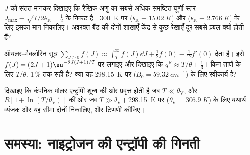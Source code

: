 \begin{exercise}[$\star\star\star$]\label{exo:b3:partition-functions:10}
$J$ को संतत मानकर दिखाइए कि रैखिक अणु का सबसे अधिक समष्टित घूर्णी स्तर
$J_{\max} = \sqrt{T/2\theta_{\mathrm R}} - \frac12$ के निकट है। \qty{300}{K} पर 
($\theta_{\mathrm R} = \qty{15.02}{K}$) और  ($\theta_{\mathrm R} = \qty{2.766}{K}$) के लिए इसका मान निकालिए। अवरक्त बैंड की दोनों
शाखाएँ केंद्र से कुछ रेखाएँ दूर सबसे प्रबल क्यों होती हैं?
\end{exercise}

\begin{exercise}[$\star\star\star$]\label{exo:b3:partition-functions:11}
ऑयलर--मैक्लॉरिन सूत्र $\sum_{J\ge0}f(J) \approx \int_0^\infty f(J)\dd J + \frac12f(0) -
\frac1{12}f'(0)$ देता है। इसे $f(J) = (2J+1)\eu^{-\theta J(J+1)/T}$ पर लगाइए और दिखाइए कि $q^{\mathrm R} \approx T/\theta +
\frac13$। किन तापों के लिए $T/\theta$, 1\,\% तक सही है? क्या यह \qty{298.15}{K} पर 
($B_0 = \qty{59.32}{cm^{-1}}$) के लिए स्वीकार्य है?
\end{exercise}

\begin{exercise}[$\star\star\star$]\label{exo:b3:partition-functions:12}
दिखाइए कि कंपनिक मोलर एन्ट्रॉपी शून्य की ओर प्रवृत्त होती है जब $T \ll \theta_{\mathrm V}$, और
$R[1 + \ln(T/\theta_{\mathrm V})]$ की ओर जब $T \gg \theta_{\mathrm V}$। \qty{298.15}{K} पर 
($\theta_{\mathrm V} = \qty{306.9}{K}$) के लिए यथार्थ व्यंजक और यह सीमा दोनों निकालिए, और टिप्पणी कीजिए।
\end{exercise}

\section{समस्या: नाइट्रोजन की एन्ट्रॉपी की गिनती}

